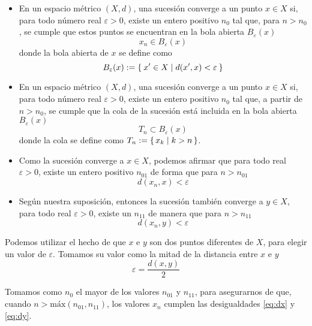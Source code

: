 \documentclass[a4paper,10pt]{article}
\begin{document}
\begin{soluc}
\begin{cutebox}[colbacktitle=gray!60!green]
\begin{itemize}
    \item En un espacio métrico $(X, d)$, una sucesión converge a un punto
      $x\in X$ si, para todo número real $\varepsilon > 0$, existe un entero
      positivo $n_0$ tal que, para $n > n_0$, se cumple que estos puntos se
      encuentran en la bola abierta $B_{\varepsilon}(x)$
      \[
        x_n \in B_{\varepsilon}(x)
      \]
      donde la bola abierta de $x$ se define como
      \[
        B_{\varepsilon}(x) := \Set{x'\in X | d(x', x) < \varepsilon}
      \]
      
    \item En un espacio métrico $(X, d)$, una sucesión converge a un punto
      $x\in X$ si, para todo número real $\varepsilon > 0$, existe un entero
      positivo $n_0$ tal que, a partir de $n > n_0$, se cumple que la cola de
      la sucesión está incluida en la bola abierta $B_{\varepsilon}(x)$
      \[
        T_n \subset B_{\varepsilon}(x)
      \]
      donde la cola se define como $T_n := \set{x_k | k > n}$.
   \end{itemize}
  \end{cutebox} %

  \medskip
  \begin{itemize}
  \item Como la sucesión converge a $x\in X$, podemos afirmar que para
    todo real $\varepsilon > 0$, existe un entero positivo $n_{01}$ de forma
    que para $n > n_{01}$
    \begin{equation}\label{eq:dx}
      d(x_n, x) < \varepsilon
    \end{equation}
  \item Según nuestra suposición, entonces la sucesión también converge a
    $y \in X$, para todo real $\varepsilon > 0$, existe un $n_{11}$ de manera
    que para $n > n_{11}$
    \begin{equation}\label{eq:dy}
      d(x_n, y) < \varepsilon
    \end{equation}    
  \end{itemize}

  Podemos utilizar el hecho de que $x$ e $y$ son dos puntos diferentes de $X$,
  para elegir un valor de $\varepsilon$. Tomamos su valor como la mitad de la
  distancia entre $x$ e $y$
  \begin{equation}\label{eq:dxy}
    \varepsilon = \dfrac{d(x,y)}{2}
  \end{equation}

  Tomamos como $n_0$ el mayor de los valores $n_{01}$ y $n_{11}$, para
  asegurarnos de que, cuando $n > \text{máx}(n_{01}, n_{11})$, los valores $x_n$
  cumplen las desigualdades \eqref{eq:dx} y \eqref{eq:dy}.
  

\end{soluc}
\end{document}
